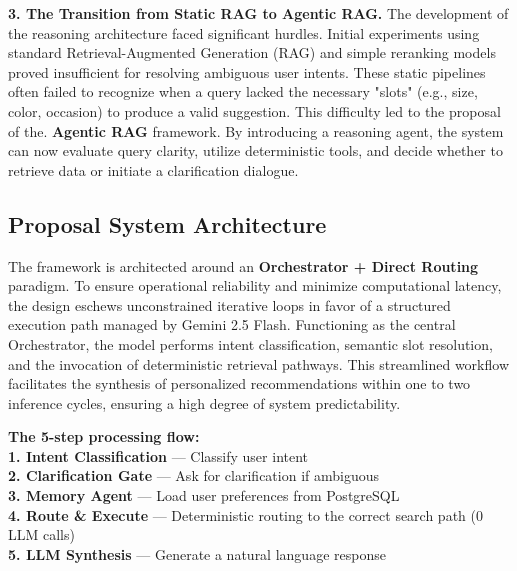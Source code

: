 \textbf{3. The Transition from Static RAG to Agentic RAG.} The development of the reasoning architecture faced significant hurdles. Initial experiments using standard Retrieval-Augmented Generation (RAG) and simple reranking models proved insufficient for resolving ambiguous user intents. These static pipelines often failed to recognize when a query lacked the necessary "slots" (e.g., size, color, occasion) to produce a valid suggestion. This difficulty led to the proposal of the. \textbf{Agentic RAG} framework. By introducing a reasoning agent, the system can now evaluate query clarity, utilize deterministic tools, and decide whether to retrieve data or initiate a clarification dialogue.
\subsection{Proposal System Architecture}
The framework is architected around an  \textbf{Orchestrator + Direct Routing} paradigm. To ensure operational reliability and minimize computational latency, the design eschews unconstrained iterative loops in favor of a structured execution path managed by Gemini 2.5 Flash. Functioning as the central Orchestrator, the model performs intent classification, semantic slot resolution, and the invocation of deterministic retrieval pathways. This streamlined workflow facilitates the synthesis of personalized recommendations within one to two inference cycles, ensuring a high degree of system predictability.

\noindent \textbf{The 5-step processing flow:} \\
\textbf{1. Intent Classification} --- Classify user intent \\
\textbf{2. Clarification Gate} --- Ask for clarification if ambiguous \\
\textbf{3. Memory Agent} --- Load user preferences from PostgreSQL \\
\textbf{4. Route \& Execute} --- Deterministic routing to the correct search path (0 LLM calls) \\
\textbf{5. LLM Synthesis} --- Generate a natural language response

